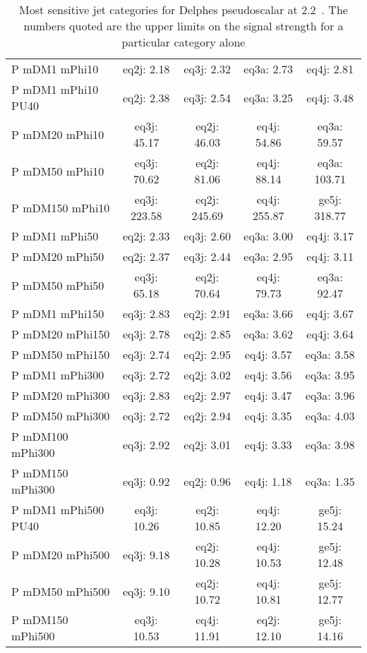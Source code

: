 \begin{table}
\begin{center}
\footnotesize
\caption{Most sensitive jet categories for Delphes pseudoscalar at 2.2~\ifb. The numbers quoted are the upper limits on the signal strength for a particular category alone}
\begin{tabular}{|l|c|c|c|c|}
\hline
 P mDM1 mPhi10 & eq2j: 2.18 & eq3j: 2.32 & eq3a: 2.73 & eq4j: 2.81 \\ 
 P mDM1 mPhi10 PU40 & eq2j: 2.38 & eq3j: 2.54 & eq3a: 3.25 & eq4j: 3.48 \\ 
 P mDM20 mPhi10 & eq3j: 45.17 & eq2j: 46.03 & eq4j: 54.86 & eq3a: 59.57 \\ 
 P mDM50 mPhi10 & eq3j: 70.62 & eq2j: 81.06 & eq4j: 88.14 & eq3a: 103.71 \\ 
 P mDM150 mPhi10 & eq3j: 223.58 & eq2j: 245.69 & eq4j: 255.87 & ge5j: 318.77 \\ 
 P mDM1 mPhi50 & eq2j: 2.33 & eq3j: 2.60 & eq3a: 3.00 & eq4j: 3.17 \\ 
 P mDM20 mPhi50 & eq2j: 2.37 & eq3j: 2.44 & eq3a: 2.95 & eq4j: 3.11 \\ 
 P mDM50 mPhi50 & eq3j: 65.18 & eq2j: 70.64 & eq4j: 79.73 & eq3a: 92.47 \\ 
 P mDM1 mPhi150 & eq3j: 2.83 & eq2j: 2.91 & eq3a: 3.66 & eq4j: 3.67 \\ 
 P mDM20 mPhi150 & eq3j: 2.78 & eq2j: 2.85 & eq3a: 3.62 & eq4j: 3.64 \\ 
 P mDM50 mPhi150 & eq3j: 2.74 & eq2j: 2.95 & eq4j: 3.57 & eq3a: 3.58 \\ 
 P mDM1 mPhi300 & eq3j: 2.72 & eq2j: 3.02 & eq4j: 3.56 & eq3a: 3.95 \\ 
 P mDM20 mPhi300 & eq3j: 2.83 & eq2j: 2.97 & eq4j: 3.47 & eq3a: 3.96 \\ 
 P mDM50 mPhi300 & eq3j: 2.72 & eq2j: 2.94 & eq4j: 3.35 & eq3a: 4.03 \\ 
 P mDM100 mPhi300 & eq3j: 2.92 & eq2j: 3.01 & eq4j: 3.33 & eq3a: 3.98 \\ 
 P mDM150 mPhi300 & eq3j: 0.92 & eq2j: 0.96 & eq4j: 1.18 & eq3a: 1.35 \\ 
 P mDM1 mPhi500 PU40 & eq3j: 10.26 & eq2j: 10.85 & eq4j: 12.20 & ge5j: 15.24 \\ 
 P mDM20 mPhi500 & eq3j: 9.18 & eq2j: 10.28 & eq4j: 10.53 & ge5j: 12.48 \\ 
 P mDM50 mPhi500 & eq3j: 9.10 & eq2j: 10.72 & eq4j: 10.81 & ge5j: 12.77 \\ 
 P mDM150 mPhi500 & eq3j: 10.53 & eq4j: 11.91 & eq2j: 12.10 & ge5j: 14.16 \\ 
\hline
\end{tabular}
\end{center}
\label{tab:msb_ScorpionDMP}
\end{table}